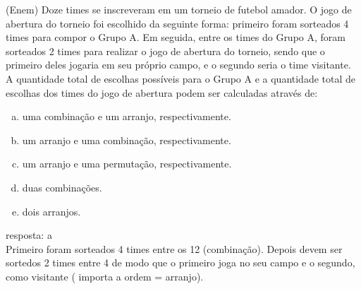 \begin{ex}
  (Enem) Doze times se inscreveram em um torneio de futebol amador. O jogo de abertura do torneio foi escolhido da seguinte forma: primeiro foram sorteados 4 times para compor o Grupo A. Em seguida, entre os times do Grupo A, foram sorteados 2 times para realizar o jogo de abertura do torneio, sendo que o primeiro deles jogaria em seu próprio campo, e o segundo seria o time visitante. \\
  A quantidade total de escolhas possíveis para o Grupo A e a quantidade total de escolhas dos times do jogo de abertura podem ser calculadas através de:
    \begin{enumerate}  [(a)]
        \item uma combinação e um arranjo, respectivamente.
        \item um arranjo e uma combinação, respectivamente.
        \item um arranjo e uma permutação, respectivamente.
        \item duas combinações.
        \item dois arranjos.
    \end{enumerate}
      \begin{sol}
      resposta: a \\
      Primeiro foram sorteados 4 times  entre os 12 (combinação).
      Depois devem ser sortedos 2 times entre 4 de modo que o primeiro joga no seu campo e o segundo, como visitante ( importa a ordem = arranjo).
      \end{sol}
 \end{ex}
